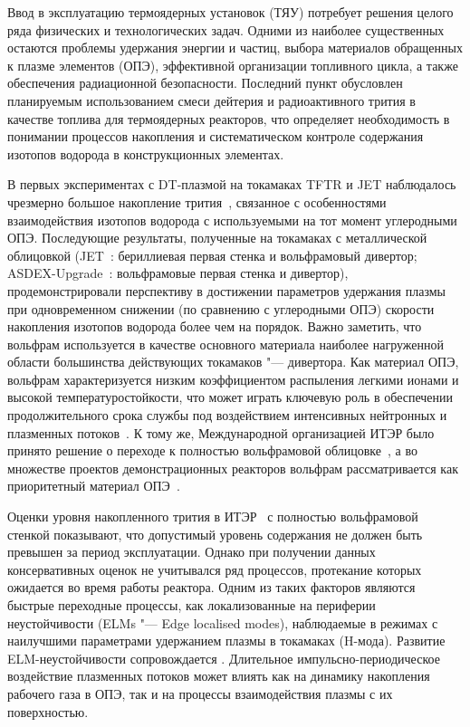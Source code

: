 Ввод в эксплуатацию термоядерных установок (ТЯУ) потребует решения целого ряда физических и технологических задач. Одними из наиболее существенных остаются проблемы удержания энергии и частиц, выбора материалов обращенных к плазме элементов (ОПЭ), эффективной организации топливного цикла, а также обеспечения радиационной безопасности. Последний пункт обусловлен планируемым использованием смеси дейтерия и радиоактивного трития в качестве топлива для термоядерных реакторов, что определяет необходимость в понимании процессов накопления и систематическом контроле содержания изотопов водорода в конструкционных элементах.

В первых экспериментах с DT-плазмой на токамаках TFTR и JET наблюдалось чрезмерно большое накопление трития~\cite{Gasparyan2024}, связанное с особенностями взаимодействия изотопов водорода с используемыми на тот момент углеродными ОПЭ. Последующие результаты, полученные на токамаках с металлической облицовкой (JET~\cite{Maggi2024,Kappatou2025}: бериллиевая первая стенка и вольфрамовый дивертор; ASDEX-Upgrade~\cite{Rohde2009}: вольфрамовые первая стенка и дивертор), продемонстрировали перспективу в достижении  параметров удержания плазмы при одновременном снижении (по сравнению с углеродными ОПЭ) скорости накопления изотопов водорода более чем на порядок. Важно заметить, что вольфрам используется в качестве основного материала наиболее нагруженной области большинства действующих токамаков "--- дивертора. Как материал ОПЭ, вольфрам характеризуется низким коэффициентом распыления легкими ионами и высокой температуростойкости, что может играть ключевую роль в обеспечении продолжительного срока службы под воздействием интенсивных нейтронных и плазменных потоков~\cite{Neu2005}. К тому же, Международной организацией ИТЭР было принято решение о переходе к полностью вольфрамовой облицовке~\cite{Barabaschi2025}, а во множестве проектов демонстрационных реакторов вольфрам рассматривается как приоритетный материал ОПЭ~\cite{Bachmann2016}.

Оценки уровня накопленного трития в ИТЭР~\cite{Roth1,Pitts2025} с полностью вольфрамовой стенкой показывают, что допустимый уровень содержания не должен быть превышен за период эксплуатации. Однако при получении данных консервативных оценок не учитывался ряд процессов, протекание которых ожидается во время работы реактора. Одним из таких факторов являются быстрые переходные процессы, как локализованные на периферии неустойчивости (ELMs "--- Edge localised modes), наблюдаемые в режимах с наилучшими параметрами удержанием плазмы в токамаках (H-мода). Развитие ELM-неустойчивости сопровождается . Длительное импульсно-периодическое воздействие плазменных потоков может влиять как на динамику накопления рабочего газа в ОПЭ, так и на процессы взаимодействия плазмы с их поверхностью.

